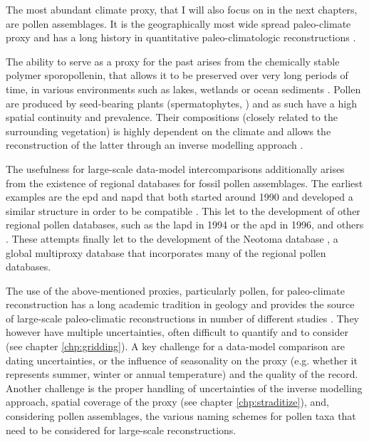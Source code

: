 \begin{refsection}
The most abundant climate proxy, that I will also focus on in the next chapters, are pollen assemblages. It is the  geographically most wide spread paleo-climate proxy \citep{BirksBirks1980}  and has a long history in quantitative paleo-climatologic reconstructions \citep[e.g.][]{Nichols1967, Nichols1969, Bradley1985}.

The ability to serve as a proxy for the past arises from the chemically stable polymer sporopollenin, that allows it to be preserved over very long periods of time, in various environments such as lakes, wetlands or ocean sediments  \citep{FaegriKalandKrzywinski1989, Havinga1967}. Pollen are produced by seed-bearing plants (spermatophytes, \cite{Wodehouse1935} ) and as such have a high spatial continuity and prevalence. Their compositions (closely related to the surrounding vegetation) is highly dependent on the climate and allows the reconstruction of the latter through an inverse modelling approach \citep{JugginsBirks2012,Juggins2013,BrewerGuiotBarboni2007}.

The usefulness for large-scale data-model intercomparisons additionally arises from the existence of regional databases for fossil pollen assemblages. The earliest examples are the \gls{epd} and \gls{napd}  that both started around 1990 and developed a similar structure in order to be compatible \citep{Grimm2008, FyfeBeaulieuBinneyEtAl2009} . This let to the development of other regional pollen databases, such as the \gls{lapd} \citep[LAPD, ][]{FlantuaHooghiemstraGrimmEtAl2015, MarchantAlmeidaBehlingEtAl2002} in 1994 or the \gls{apd} \citep{VincensLezineBuchetEtAl2007} in 1996, and others \citep[see][]{Grimm2008}. These attempts finally let to the development of the Neotoma database \citep{WilliamsGrimmBloisEtAl2018}, a global multiproxy database that incorporates many of the regional pollen databases.

The use of the above-mentioned proxies, particularly pollen, for paleo-climate reconstruction has a long academic tradition in geology \citep{Bradley1985} and provides the source of large-scale paleo-climatic reconstructions in number of different studies \citep{MauriDavisCollinsEtAl2015, DavisBrewerStevensonEtAl2003, MarsicekShumanBartleinEtAl2018, NeukomSteigerGomezNavarroEtAl2019, NeukomBarbozaErbEtAl2019}. They however have multiple uncertainties, often difficult to quantify and to consider (see chapter \ref{chp:gridding}). A key challenge for a data-model comparison are dating uncertainties, or the influence of seasonality on the proxy (e.g. whether it represents summer, winter or annual temperature) and the quality of the record. Another challenge is the proper handling of uncertainties of the inverse modelling approach, spatial coverage of the proxy (see chapter \ref{chp:straditize}), and, considering pollen assemblages, the various naming schemes for pollen taxa that need to be considered for large-scale reconstructions.



\end{refsection}
